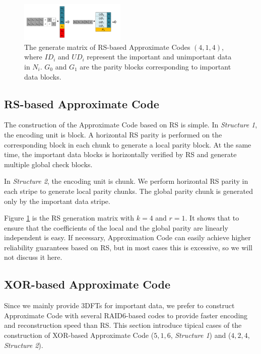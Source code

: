 \documentclass[sigconf]{acmart}
\begin{document}
\begin{figure}[htb]
\centering
\includegraphics[width=0.45\textwidth]{photo/AP-RS-43.pdf}
\caption{The generate matrix of RS-based Approximate Codes $(4,1,4)$, where $ID_i$ and $UD_i$ represent the important and unimportant data in $N_i$. $G_0$ and $G_1$ are the parity blocks corresponding to important data blocks.}
\label{fig-ap-rs}
\end{figure}

\subsection{RS-based Approximate Code}
The construction of the Approximate Code based on RS is simple. In \emph{Structure 1}, the encoding unit is block. A horizontal RS parity is performed on the corresponding block in each chunk to generate a local parity block. At the same time, the important data blocks is horizontally verified by RS and generate multiple global check blocks.

In \emph{Structure 2}, the encoding unit is chunk.
We perform horizontal RS parity in each stripe to generate local parity chunks. The global parity chunk is generated only by the important data stripe.

Figure \ref{fig-ap-rs} is the RS generation matrix with $k=4$ and $r=1$.
It shows that to ensure that the coefficients of the local and the global parity are linearly independent is easy. If necessary, Approximation Code can easily achieve higher reliability guarantees based on RS, but in most cases this is excessive, so we will not discuss it here.

\subsection{XOR-based Approximate Code}
Since we mainly provide 3DFTs for important data, we prefer to construct Approximate Code with several RAID6-based codes to provide faster encoding and reconstruction speed than RS. This section introduce tipical cases of the construction of XOR-based Approximate Code ($5,1,6$, \emph{Structure 1}) and ($4,2,4$, \emph{Structure 2}).
\end{document}
